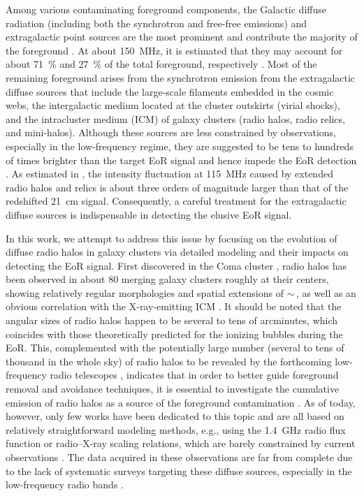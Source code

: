 \documentclass[modern]{aastex62}
\begin{document}
Among various contaminating foreground components, the Galactic diffuse
radiation (including both the synchrotron and free-free emissions)
and extragalactic point sources are the most prominent and contribute
the majority of the foreground
\citep[e.g.,][]{shaver1999,diMatteo2004,gleser2008,liu2012,murray2017}.
At about \SI{150}{\MHz}, it is estimated that they may account for
about \SI{71}{\percent} and \SI{27}{\percent} of the total foreground,
respectively \citep{shaver1999}.
Most of the remaining foreground arises from the synchrotron emission
from the extragalactic diffuse sources that include the large-scale
filaments embedded in the cosmic webs,
the intergalactic medium located at the cluster outskirts (virial shocks),
and the intracluster medium (ICM) of galaxy clusters (radio halos,
radio relics, and mini-halos).
{\color{cyan}%
Although these sources are less constrained by observations, especially
in the low-frequency regime, they are suggested to be tens to hundreds
of times brighter than the target EoR signal and hence impede the EoR
detection \citep[e.g.,][]{waxman2000,diMatteo2004,gleser2008}.
As estimated in \citet{diMatteo2004}, the intensity fluctuation at
\SI{115}{\MHz} caused by extended radio halos and relics is about three
orders of magnitude larger than that of the redshifted 21~cm signal.
Consequently, a careful treatment for the extragalactic diffuse sources
is indispensable in detecting the elusive EoR signal.}

In this work, we attempt to address this issue by focusing on the
evolution of diffuse radio halos in galaxy clusters via detailed
modeling and their impacts on detecting the EoR signal.
First discovered in the Coma cluster \citep{large1959}, radio halos
has been observed in about 80 merging galaxy clusters roughly at
their centers, showing relatively regular morphologies and spatial
extensions of $\sim\,$\si{\Mpc}, as well as an obvious correlation
with the X-ray-emitting ICM \citep[e.g.,][]{cassano2013}.
It should be noted that the angular sizes of radio halos happen to be
several to tens of arcminutes, which coincides with those theoretically
predicted for the ionizing bubbles during the EoR.
This, complemented with the potentially large number
(several to tens of thousand in the whole sky)
of radio halos to be revealed by the forthcoming
low-frequency radio telescopes \citep[e.g.,][]{cassano2015},
indicates that in order to better guide foreground removal and avoidance
techniques, it is essential to investigate the cumulative emission
of radio halos as a source of the foreground contamination
\citep[e.g.,][]{diMatteo2004,gleser2008}.
As of today, however, only few works have been dedicated to this topic
and are all based on relatively straightforward modeling methods,
e.g., using the \SI{1.4}{\GHz} radio flux function or radio--X-ray
scaling relations, which are barely constrained by current observations
\citep[e.g.,][]{gleser2008,jelic2008}.
The data acquired in these observations are far from complete due to
the lack of systematic surveys targeting these diffuse sources,
especially in the low-frequency radio bands \citep[e.g.,][]{kale2016rev}.
\end{document}
